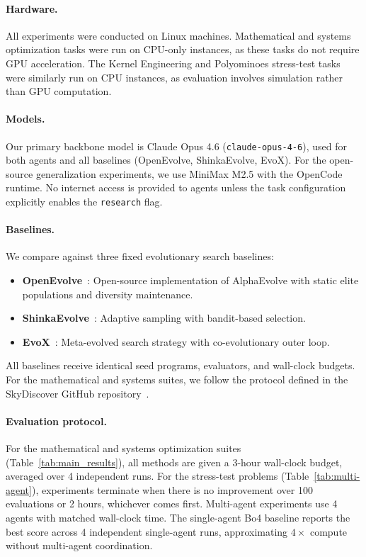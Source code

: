 \paragraph{Hardware.} All experiments were conducted on Linux machines. Mathematical and systems optimization tasks were run on CPU-only instances, as these tasks do not require GPU acceleration. The Kernel Engineering and Polyominoes stress-test tasks were similarly run on CPU instances, as evaluation involves simulation rather than GPU computation.

\paragraph{Models.} Our primary backbone model is Claude Opus 4.6 (\texttt{claude-opus-4-6}), used for both \method{} agents and all baselines (OpenEvolve, ShinkaEvolve, EvoX). For the open-source generalization experiments, we use MiniMax M2.5 with the OpenCode~\citep{opencode2025} runtime. No internet access is provided to agents unless the task configuration explicitly enables the \texttt{research} flag.

\paragraph{Baselines.} We compare against three fixed evolutionary search baselines:
\begin{itemize}[nosep,leftmargin=*]
    \item \textbf{OpenEvolve}~\citep{sharma2025openevolve}: Open-source implementation of AlphaEvolve with static elite populations and diversity maintenance.
    \item \textbf{ShinkaEvolve}~\citep{lange2025shinkaevolve}: Adaptive sampling with bandit-based selection.
    \item \textbf{EvoX}~\citep{liu2026evox}: Meta-evolved search strategy with co-evolutionary outer loop.
\end{itemize}
All baselines receive identical seed programs, evaluators, and wall-clock budgets. For the mathematical and systems suites, we follow the protocol defined in the SkyDiscover GitHub repository~\citep{skydiscover2026}.

\paragraph{Evaluation protocol.} For the mathematical and systems optimization suites (Table~\ref{tab:main_results}), all methods are given a 3-hour wall-clock budget, averaged over 4 independent runs. For the stress-test problems (Table~\ref{tab:multi-agent}), experiments terminate when there is no improvement over 100 evaluations or 2 hours, whichever comes first. Multi-agent experiments use 4 agents with matched wall-clock time. The single-agent Bo4 baseline reports the best score across 4 independent single-agent runs, approximating $4\times$ compute without multi-agent coordination.

